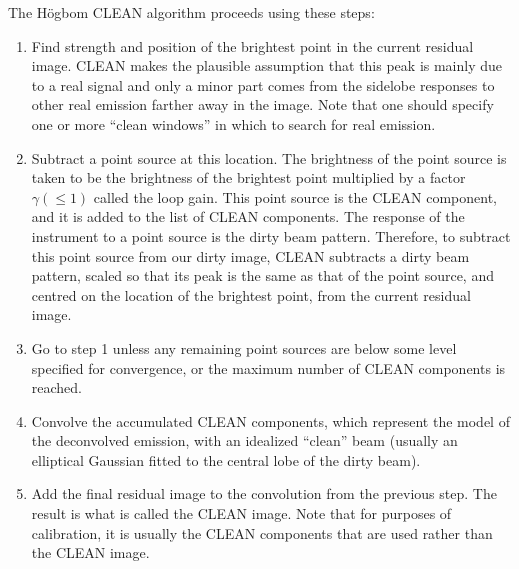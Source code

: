 \documentclass[force,almostfull,justified]{tufte-book}
\begin{document}
The H\"{o}gbom CLEAN algorithm proceeds using these steps:
\begin{enumerate}

\item Find strength and position of the brightest point in the current residual image.  CLEAN makes
the plausible assumption that this peak is mainly due to a real signal and only a minor part comes
from the sidelobe responses to other real emission farther away in the image.  Note that one should
specify one or more ``clean windows'' in which to search for real emission.
\item Subtract a point source at this location.  The brightness of the point source is taken to be the
brightness of the brightest point multiplied by a factor $\gamma (\leq 1)$ called the loop gain.  This
point source is the CLEAN component, and it is added to the list of CLEAN components.  The response of
the instrument to a point source is the dirty beam pattern.  Therefore, to subtract this point source
from our dirty image, CLEAN subtracts a dirty beam pattern, scaled so that its peak is the same as
that of the point source, and centred on the location of the brightest point, from the current
residual image.
\item Go to step 1 unless any remaining point sources are below some level specified for convergence,
or the maximum number of CLEAN components is reached.
\item Convolve the accumulated CLEAN components, which represent the model of the deconvolved
emission, with an idealized ``clean'' beam (usually an elliptical Gaussian fitted to the central lobe
of the dirty beam).
\item Add the final residual image to the convolution from the previous step.  The result is what is
called the CLEAN image.  Note that for purposes of calibration, it is usually the CLEAN components
that are used rather than the CLEAN image.

\end{enumerate}
\end{document}

